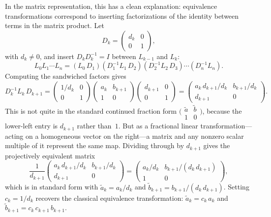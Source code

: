 \documentclass{article}
\begin{document}
In the matrix representation, this has a clean explanation: equivalence transformations correspond to inserting factorizations of the identity between terms in the matrix product. Let
\begin{equation}
  D_k = \begin{pmatrix} d_k & 0 \\ 0 & 1 \end{pmatrix},
\end{equation}
with $d_k \neq 0$, and insert $D_k D_k^{-1} = I$ between $L_{k-1}$ and $L_k$:
\begin{equation}
  L_0 L_1 \cdots L_n
  = (L_0\, D_1)(D_1^{-1} L_1\, D_2)(D_2^{-1} L_2\, D_3) \cdots (D_n^{-1} L_n).
\end{equation}
Computing the sandwiched factors gives
\begin{equation}
  D_k^{-1} L_k\, D_{k+1}
  = \begin{pmatrix} 1/d_k & 0 \\ 0 & 1 \end{pmatrix}
    \begin{pmatrix} a_k & b_{k+1} \\ 1 & 0 \end{pmatrix}
    \begin{pmatrix} d_{k+1} & 0 \\ 0 & 1 \end{pmatrix}
  = \begin{pmatrix} a_k\, d_{k+1}/d_k & b_{k+1}/d_k \\ d_{k+1} & 0 \end{pmatrix}.
\end{equation}
This is not quite in the standard continued fraction form $\bigl(\begin{smallmatrix} \tilde{a} & \tilde{b} \\ 1 & 0 \end{smallmatrix}\bigr)$, because the lower-left entry is $d_{k+1}$ rather than~$1$. But as a fractional linear transformation---acting on a homogeneous vector on the right---a matrix and any nonzero scalar multiple of it represent the same map. Dividing through by $d_{k+1}$ gives the projectively equivalent matrix
\begin{equation}
  \frac{1}{d_{k+1}}\begin{pmatrix} a_k\, d_{k+1}/d_k & b_{k+1}/d_k \\ d_{k+1} & 0 \end{pmatrix}
  = \begin{pmatrix} a_k/d_k & b_{k+1}/(d_k\, d_{k+1}) \\ 1 & 0 \end{pmatrix},
\end{equation}
which is in standard form with $\tilde{a}_k = a_k / d_k$ and $\tilde{b}_{k+1} = b_{k+1}/(d_k\, d_{k+1})$. Setting $c_k = 1/d_k$ recovers the classical equivalence transformation: $\tilde{a}_k = c_k\, a_k$ and $\tilde{b}_{k+1} = c_k\, c_{k+1}\, b_{k+1}$.
\end{document}
